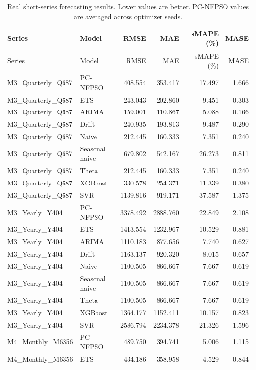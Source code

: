 \scriptsize
\begin{longtable}{llrrrr}
\caption{Real short-series forecasting results. Lower values are better. PC-NFPSO values are averaged across optimizer seeds.}
\label{tab:real_short_series_metrics}\\
\hline
Series & Model & RMSE & MAE & sMAPE (\%) & MASE \\
\hline
\endfirsthead
\hline
Series & Model & RMSE & MAE & sMAPE (\%) & MASE \\
\hline
\endhead
M3\_Quarterly\_Q687 & PC-NFPSO & 408.554 & 353.417 & 17.497 & 1.666 \\
M3\_Quarterly\_Q687 & ETS & 243.043 & 202.860 & 9.451 & 0.303 \\
M3\_Quarterly\_Q687 & ARIMA & 159.001 & 110.867 & 5.088 & 0.166 \\
M3\_Quarterly\_Q687 & Drift & 240.935 & 193.813 & 9.487 & 0.290 \\
M3\_Quarterly\_Q687 & Naive & 212.445 & 160.333 & 7.351 & 0.240 \\
M3\_Quarterly\_Q687 & Seasonal naive & 679.802 & 542.167 & 26.273 & 0.811 \\
M3\_Quarterly\_Q687 & Theta & 212.445 & 160.333 & 7.351 & 0.240 \\
M3\_Quarterly\_Q687 & XGBoost & 330.578 & 254.371 & 11.339 & 0.380 \\
M3\_Quarterly\_Q687 & SVR & 1139.816 & 919.171 & 37.587 & 1.375 \\
M3\_Yearly\_Y404 & PC-NFPSO & 3378.492 & 2888.760 & 22.849 & 2.108 \\
M3\_Yearly\_Y404 & ETS & 1413.554 & 1232.967 & 10.529 & 0.881 \\
M3\_Yearly\_Y404 & ARIMA & 1110.183 & 877.656 & 7.740 & 0.627 \\
M3\_Yearly\_Y404 & Drift & 1163.137 & 920.320 & 8.015 & 0.657 \\
M3\_Yearly\_Y404 & Naive & 1100.505 & 866.667 & 7.667 & 0.619 \\
M3\_Yearly\_Y404 & Seasonal naive & 1100.505 & 866.667 & 7.667 & 0.619 \\
M3\_Yearly\_Y404 & Theta & 1100.505 & 866.667 & 7.667 & 0.619 \\
M3\_Yearly\_Y404 & XGBoost & 1364.177 & 1152.411 & 10.157 & 0.823 \\
M3\_Yearly\_Y404 & SVR & 2586.794 & 2234.378 & 21.326 & 1.596 \\
M4\_Monthly\_M6356 & PC-NFPSO & 489.750 & 394.741 & 5.006 & 1.115 \\
M4\_Monthly\_M6356 & ETS & 434.186 & 358.958 & 4.529 & 0.844 \\

\end{longtable}
